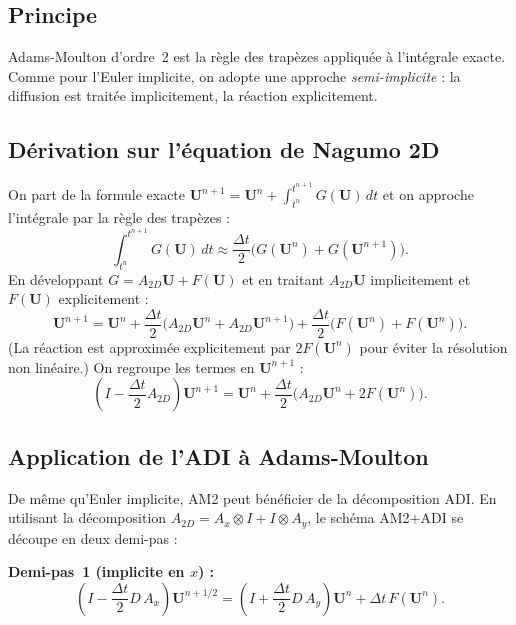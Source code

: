 \documentclass[11pt,a4paper]{report}
\begin{document}
\subsection*{Principe}

Adams-Moulton d'ordre~2 est la r\`egle des trap\`ezes appliqu\'ee \`a l'int\'egrale exacte.
Comme pour l'Euler implicite, on adopte une approche \emph{semi-implicite} : la diffusion
est trait\'ee implicitement, la r\'eaction explicitement.

\subsection*{D\'erivation sur l'\'equation de Nagumo 2D}

On part de la formule exacte
$\mathbf{U}^{n+1} = \mathbf{U}^n + \int_{t^n}^{t^{n+1}} G(\mathbf{U})\,dt$
et on approche l'int\'egrale par la r\`egle des trap\`ezes :
\begin{equation}
  \int_{t^n}^{t^{n+1}} G(\mathbf{U})\,dt \approx \frac{\Delta t}{2}\bigl(G(\mathbf{U}^n)+G(\mathbf{U}^{n+1})\bigr).
\end{equation}
En d\'eveloppant $G = A_{2D}\mathbf{U} + F(\mathbf{U})$ et en traitant $A_{2D}\mathbf{U}$
implicitement et $F(\mathbf{U})$ explicitement :
\begin{equation}
  \mathbf{U}^{n+1} = \mathbf{U}^n
    + \frac{\Delta t}{2}\bigl(A_{2D}\mathbf{U}^n + A_{2D}\mathbf{U}^{n+1}\bigr)
    + \frac{\Delta t}{2}\bigl(F(\mathbf{U}^n) + F(\mathbf{U}^n)\bigr).
\end{equation}
(La r\'eaction est approxim\'ee explicitement par $2F(\mathbf{U}^n)$ pour \'eviter la
r\'esolution non lin\'eaire.) On regroupe les termes en $\mathbf{U}^{n+1}$ :
\begin{equation}
  \boxed{\left(I - \frac{\Delta t}{2}A_{2D}\right)\mathbf{U}^{n+1}
    = \mathbf{U}^n + \frac{\Delta t}{2}\bigl(A_{2D}\mathbf{U}^n + 2F(\mathbf{U}^n)\bigr).}
\end{equation}

\subsection*{Application de l'ADI \`a Adams-Moulton}

De m\^eme qu'Euler implicite, AM2 peut b\'en\'eficier de la d\'ecomposition ADI.
En utilisant la d\'ecomposition $A_{2D} = A_x \otimes I + I \otimes A_y$, le sch\'ema
AM2+ADI se d\'ecoupe en deux demi-pas :

\textbf{Demi-pas~1 (implicite en $x$) :}
\begin{equation}
  \left(I - \frac{\Delta t}{2}D\,A_x\right)\mathbf{U}^{n+1/2}
  = \left(I + \frac{\Delta t}{2}D\,A_y\right)\mathbf{U}^n + \Delta t\,F(\mathbf{U}^n).
\end{equation}
\end{document}
